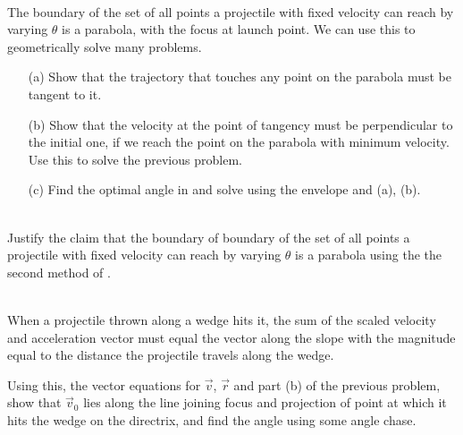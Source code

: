 \begin{exc}
        \begin{exercise}[subtitle={Parabolic Envelope, Knzhou}, points = 5]
            \smallskip
            ~\\
            The boundary of the set of all points a projectile with fixed velocity can reach by varying $\theta$ is 
            a parabola, with the focus at launch point. We can use this to geometrically solve many problems.
            \begin{enumerate}
                \item[(a)] Show that the trajectory that touches any point on the parabola must be tangent to it.
                \item[(b)] Show that the velocity at the point of tangency must be perpendicular to the initial one, if 
                we reach the point on the parabola with minimum velocity. Use this to solve the previous problem.
                \item[(c)]  Find the optimal angle in  and solve 
                using the envelope and (a), (b). 
            \end{enumerate}
        \end{exercise}

        \begin{exercise}[subtitle={Parabolic Envelope}, points = 3]
        \smallskip
        ~\\
        Justify the claim that the boundary of boundary of the set of all points a projectile with fixed velocity can reach by varying $\theta$ is 
        a parabola using the the second method of .
        \end{exercise}

        \begin{exercise}[subtitle={Projectiles with Vector, V2.}, points = 3]
            \smallskip
            ~\\
            When a projectile thrown along a wedge hits it, the sum of the scaled velocity and acceleration vector 
            must equal the vector along the slope with the magnitude equal to the distance the projectile travels 
            along the wedge. 
            
            Using this, the vector equations for $\vec{v}$, $\vec{r}$ and part (b) of the previous problem,
            show that $\vec{v}_0$ lies along the line joining focus and 
            projection of point at which it hits the wedge on the directrix, and find the angle using some angle chase.
            

\end{exercise}
\end{exc}

